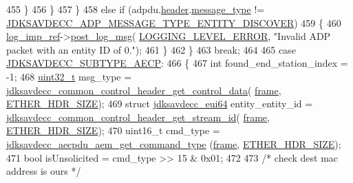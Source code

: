 \begin{DoxyCode}
{455                     \}
456                 \}
457             \}
458             \textcolor{keywordflow}{else} \textcolor{keywordflow}{if} (adpdu.\hyperlink{structjdksavdecc__adpdu_a250e8a37ff2e4ef65d00d9175619a72a}{header}.\hyperlink{structjdksavdecc__adpdu__common__control__header_a84c56f5f8c75e0b021f73b2882280040}{message\_type} != 
      \hyperlink{group__adpdu__msg_ga71372df276c0ad5c2b62ba9cd8bcacbd}{JDKSAVDECC\_ADP\_MESSAGE\_TYPE\_ENTITY\_DISCOVER})
459             \{
460                 \hyperlink{namespaceavdecc__lib_acbe3e2a96ae6524943ca532c87a28529}{log\_imp\_ref}->\hyperlink{classavdecc__lib_1_1log_a68139a6297697e4ccebf36ccfd02e44a}{post\_log\_msg}(
      \hyperlink{namespaceavdecc__lib_a501055c431e6872ef46f252ad13f85cdaf2c4481208273451a6f5c7bb9770ec8a}{LOGGING\_LEVEL\_ERROR}, \textcolor{stringliteral}{"Invalid ADP packet with an entity ID of 0."});
461             \}
462         \}
463         \textcolor{keywordflow}{break};
464 
465         \textcolor{keywordflow}{case} \hyperlink{group__subtype_ga4f1d76227a738f442d15ebaf2253b6b3}{JDKSAVDECC\_SUBTYPE\_AECP}:
466         \{
467             \textcolor{keywordtype}{int} found\_end\_station\_index = -1;
468             \hyperlink{parse_8c_a6eb1e68cc391dd753bc8ce896dbb8315}{uint32\_t} msg\_type = 
      \hyperlink{group__jdksavdecc__avtp__common__control__header_gacb435e5d647474931972cb9eb93b4e41}{jdksavdecc\_common\_control\_header\_get\_control\_data}(
      \hyperlink{gst__avb__playbin_8c_ac8e710e0b5e994c0545d75d69868c6f0}{frame}, \hyperlink{namespaceavdecc__lib_a6c827b1a0d973e18119c5e3da518e65ca9512ad9b34302ba7048d88197e0a2dc0}{ETHER\_HDR\_SIZE});
469             \textcolor{keyword}{struct }\hyperlink{structjdksavdecc__eui64}{jdksavdecc\_eui64} entity\_entity\_id = 
      \hyperlink{group__jdksavdecc__avtp__common__control__header_ga99181000ee374936c8518f657fa9f5cd}{jdksavdecc\_common\_control\_header\_get\_stream\_id}(
      \hyperlink{gst__avb__playbin_8c_ac8e710e0b5e994c0545d75d69868c6f0}{frame}, \hyperlink{namespaceavdecc__lib_a6c827b1a0d973e18119c5e3da518e65ca9512ad9b34302ba7048d88197e0a2dc0}{ETHER\_HDR\_SIZE});
470             uint16\_t cmd\_type = \hyperlink{group__aecpdu__aem_ga61a282324f09f449059b9fe710363710}{jdksavdecc\_aecpdu\_aem\_get\_command\_type}
      (\hyperlink{gst__avb__playbin_8c_ac8e710e0b5e994c0545d75d69868c6f0}{frame}, \hyperlink{namespaceavdecc__lib_a6c827b1a0d973e18119c5e3da518e65ca9512ad9b34302ba7048d88197e0a2dc0}{ETHER\_HDR\_SIZE});
471             \textcolor{keywordtype}{bool} isUnsolicited = cmd\_type >> 15 & 0x01;
472 
473             \textcolor{comment}{/* check dest mac address is ours */}
}
\end{DoxyCode}
